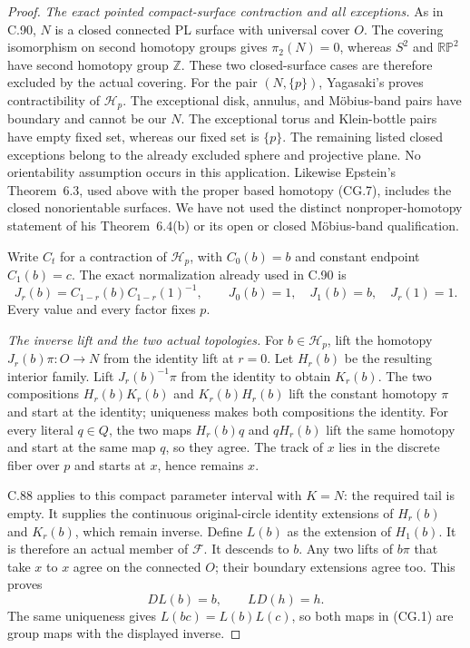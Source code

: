 \begin{proof}
\emph{The exact pointed compact-surface contraction and all exceptions.}
As in C.90, $N$ is a closed connected PL surface with
universal cover $O$.  The covering isomorphism on second
homotopy groups gives $\pi_2(N)=0$, whereas $S^2$ and
$\mathbb{RP}^2$ have second homotopy group $\mathbb Z$.
These two closed-surface cases are therefore excluded
by the actual covering.
For the pair $(N,\{p\})$, Yagasaki's
\cite[Lemma~2.1(i), p.~2; proof, p.~3]{C_Yagasaki2000}
proves contractibility of $\mathscr H_p$.
The exceptional disk, annulus, and M\"obius-band pairs
have boundary and cannot be our $N$.
The exceptional torus and Klein-bottle pairs have empty
fixed set, whereas our fixed set is $\{p\}$.
The remaining listed closed exceptions belong to the
already excluded sphere and projective plane.
No orientability assumption occurs in this application.
Likewise Epstein's Theorem~6.3, used above with the
proper based homotopy (CG.7), includes the closed
nonorientable surfaces.  We have not used the distinct
nonproper-homotopy statement of his Theorem~6.4(b)
or its open or closed M\"obius-band qualification.

Write $C_t$ for a contraction of $\mathscr H_p$,
with $C_0(b)=b$ and constant endpoint $C_1(b)=c$.
The exact normalization already used in C.90 is
\[
 J_r(b)=C_{1-r}(b)C_{1-r}(1)^{-1},
 \qquad J_0(b)=1,\quad J_1(b)=b,\quad J_r(1)=1.                \tag{CG.8}
\]
Every value and every factor fixes $p$.

\emph{The inverse lift and the two actual topologies.}
For $b\in\mathscr H_p$, lift the homotopy
$J_r(b)\pi:O\to N$ from the identity lift at $r=0$.
Let $H_r(b)$ be the resulting interior family.
Lift $J_r(b)^{-1}\pi$ from the identity to obtain $K_r(b)$.
The two compositions $H_r(b)K_r(b)$ and $K_r(b)H_r(b)$
lift the constant homotopy $\pi$ and start at the identity;
uniqueness makes both compositions the identity.
For every literal $q\in Q$, the two maps
$H_r(b)q$ and $qH_r(b)$ lift the same homotopy and
start at the same map $q$, so they agree.
The track of $x$ lies in the discrete fiber over $p$
and starts at $x$, hence remains $x$.

C.88 applies to this compact parameter interval with
$K=N$: the required tail is empty.
It supplies the continuous original-circle identity
extensions of $H_r(b)$ and $K_r(b)$, which remain inverse.
Define $L(b)$ as the extension of $H_1(b)$.
It is therefore an actual member of $\mathscr F$.
It descends to $b$.  Any two lifts of $b\pi$ that take
$x$ to $x$ agree on the connected $O$; their boundary
extensions agree too.  This proves
\[
              D L(b)=b,\qquad L D(h)=h.                       \tag{CG.9}
\]
The same uniqueness gives $L(bc)=L(b)L(c)$, so both maps
in (CG.1) are group maps with the displayed inverse.


\end{proof}
